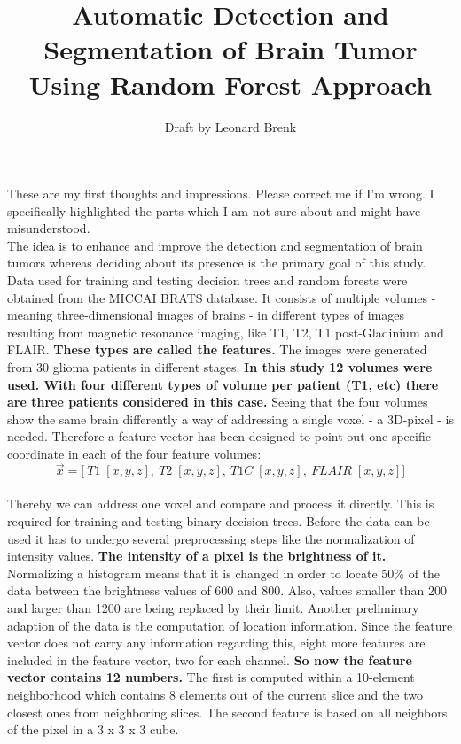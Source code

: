 \documentclass{article}
\title{Automatic Detection and Segmentation of Brain Tumor Using Random Forest Approach}
\author{Draft by Leonard Brenk}
\begin{document}
 \maketitle

 These are my first thoughts and impressions. Please correct me if I'm wrong. I specifically highlighted the parts which I am not sure about and might have misunderstood.\\

 The idea is to enhance and improve the detection and segmentation of brain tumors whereas deciding about its presence is the primary goal of this study. Data used for training and testing decision trees and random forests were obtained from the MICCAI BRATS database. It consists of multiple volumes - meaning three-dimensional images of brains - in different types of images resulting from magnetic resonance imaging, like T1, T2, T1 post-Gladinium and FLAIR. \textbf{These types are called the features.} The images were generated from 30 glioma patients in different stages. \textbf{In this study 12 volumes were used. With four different types of volume per patient (T1, etc) there are three patients considered in this case.} Seeing that the four volumes show the same brain differently a way of addressing a single voxel - a 3D-pixel - is needed. Therefore a feature-vector has been designed to point out one specific coordinate in each of the four feature volumes:\\
 \[ \vec{x} = \bigg[ \: T1\; [x,y,z], \: T2\; [x,y,z], \: T1C\; [x,y,z],\: FLAIR\; [x,y,z] \bigg] \]\\
 Thereby we can address one voxel and compare and process it directly. This is required for training and testing binary decision trees. Before the data can be used it has to undergo several preprocessing steps like the normalization of intensity values. \textbf{The intensity of a pixel is the brightness of it.} Normalizing a histogram means that it is changed in order to locate 50\% of the data between the brightness values of 600 and 800. Also, values smaller than 200 and larger than 1200 are being replaced by their limit. Another preliminary adaption of the data is the computation of location information. Since the feature vector does not carry any information regarding this, eight more features are included in the feature vector, two for each channel. \textbf{So now the feature vector contains 12 numbers.} The first is computed within a 10-element neighborhood which contains 8 elements out of the current slice and the two closest ones from neighboring slices. The second feature is based on all neighbors of the pixel in a 3 x 3 x 3 cube.\\
\end{document}
